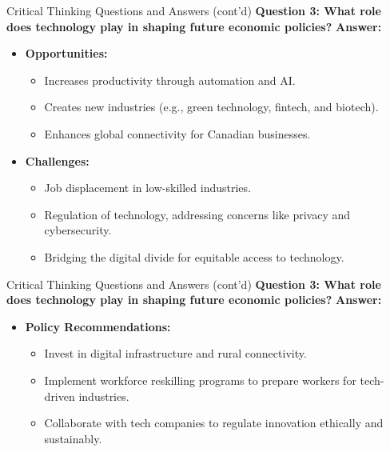 \documentclass{beamer}
\begin{document}
\begin{frame}{Critical Thinking Questions and Answers (cont'd)}
  \textbf{Question 3: What role does technology play in shaping future economic policies?}
  \pause
  \textbf{Answer:}
  \begin{itemize}
    \item \textbf{Opportunities:}
      \begin{itemize}
        \item Increases productivity through automation and AI.
        \item Creates new industries (e.g., green technology, fintech, and biotech).
        \item Enhances global connectivity for Canadian businesses.
      \end{itemize}
    \item \textbf{Challenges:}
      \begin{itemize}
        \item Job displacement in low-skilled industries.
        \item Regulation of technology, addressing concerns like privacy and cybersecurity.
        \item Bridging the digital divide for equitable access to technology.
      \end{itemize}
   
  \end{itemize}
\end{frame}


\begin{frame}{Critical Thinking Questions and Answers (cont'd)}
  \textbf{Question 3: What role does technology play in shaping future economic policies?}
  \pause
  \textbf{Answer:}
  \begin{itemize}

    \item \textbf{Policy Recommendations:}
      \begin{itemize}
        \item Invest in digital infrastructure and rural connectivity.
        \item Implement workforce reskilling programs to prepare workers for tech-driven industries.
        \item Collaborate with tech companies to regulate innovation ethically and sustainably.
      \end{itemize}
  \end{itemize}
\end{frame}
\end{document}
